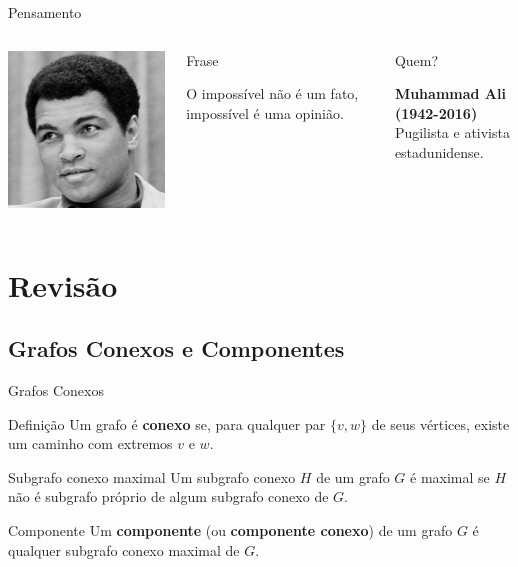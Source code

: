 \documentclass[xcolor=dvipsnames,table]{beamer}
\begin{document}
	\begin{frame}{Pensamento}
		\begin{columns}
		  		\begin{center}
		    		\includegraphics[height=.5\textheight]{images/ali.jpg}
		  		\end{center}
				\begin{block}{Frase}
					\begin{center}
						{\large O impossível não é um fato, impossível é uma opinião.}
					\end{center}
				\end{block}		  		
		  		\begin{block}{Quem?}
		  			\begin{center}
						{\bf Muhammad Ali (1942-2016)} \\Pugilista e ativista estadunidense.
					\end{center}
				\end{block}
		\end{columns}
	\end{frame}
    
    \section{Revisão}
	\subsection{Grafos Conexos e Componentes}
	\begin{frame}{Grafos Conexos}
		\begin{block}{Definição}
			Um grafo é {\bf conexo} se, para qualquer par $\{v,w\}$ de seus vértices, existe um caminho com extremos $v$ e $w$.
		\end{block}
		\begin{block}{Subgrafo conexo maximal}
			Um subgrafo conexo $H$ de um grafo $G$ é maximal se $H$ não é subgrafo próprio de algum subgrafo conexo de $G$.
		\end{block}
		\begin{block}{Componente}
			Um {\bf componente} (ou {\bf componente conexo}) de um grafo $G$ é qualquer subgrafo conexo maximal de $G$.
		\end{block}
	\end{frame}
	
\end{document}
